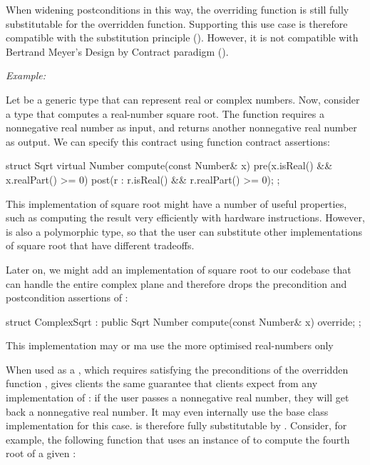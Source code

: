 When widening postconditions in this way, the overriding function is still fully substitutable for the overridden function. Supporting this use case is therefore compatible with the substitution principle (). However, it is not  compatible with Bertrand Meyer's Design by Contract paradigm ().

\emph{Example:}

Let  be a generic type that can represent real or complex numbers. Now, consider a type  that computes a real-number square root. The function  requires a nonnegative real number as input, and returns another nonnegative real number as output. We can specify this contract using function contract assertions:

\begin{codeblock}
struct Sqrt {
  virtual Number compute(const Number& x)
    pre(x.isReal() && x.realPart() >= 0)
    post(r : r.isReal() && r.realPart() >= 0);
};
\end{codeblock}

This implementation of square root might have a number of useful properties, such as computing the result very efficiently with hardware instructions. However,  is also a polymorphic type, so that the user can substitute other implementations of square root that have different tradeoffs.

Later on, we might add an implementation of square root to our codebase that can handle the entire complex plane and therefore drops the precondition and postcondition assertions of :

\begin{codeblock}
struct ComplexSqrt : public Sqrt {
  Number compute(const Number& x) override;
};
\end{codeblock}

This implementation may or ma use the more optimised real-numbers only 

When used as a , which requires satisfying the preconditions of the overridden function , \allowbreak{} gives clients the same guarantee that clients  expect from any implementation of : if the user passes a nonnegative real number, they will get back a nonnegative real number. It may even internally use the base class implementation  for this case.  is therefore fully substitutable by . Consider, for example, the following function that uses an instance of  to compute the fourth root of a given :

